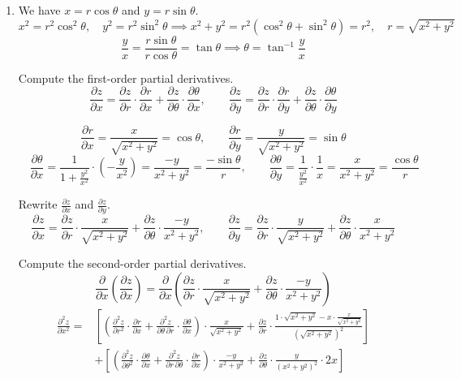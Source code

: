 \documentclass[a4paper, 12pt]{article}
\begin{document}
\begin{enumerate}[leftmargin=*,label=\textbf{\arabic*.}]
\item We have $x=r\cos\theta$ and $y=r\sin\theta$.
\[x^2=r^2\cos^2\theta,\quad y^2 =r^2\sin^2\theta\implies x^2+y^2=r^2\left(\cos^2\theta+\sin^2\theta\right)=r^2, \quad r=\sqrt{x^2+y^2}\]
\[\frac{y}{x}=\frac{r\sin\theta}{r\cos\theta}=\tan\theta \implies \theta=\tan^{-1}\frac{y}{x}\]

Compute the first-order partial derivatives.
\[\frac{\partial z}{\partial x}=\frac{\partial z}{\partial r}\cdot\frac{\partial r}{\partial x}+\frac{\partial z}{\partial \theta}\cdot\frac{\partial\theta}{\partial x},\quad\quad\frac{\partial z}{\partial y}=\frac{\partial z}{\partial r}\cdot\frac{\partial r}{\partial y} + \frac{\partial z}{\partial\theta}\cdot\frac{\partial\theta}{\partial y}\]

\vspace{-1em}
\[\frac{\partial r}{\partial x}=\frac{x}{\sqrt{x^2+y^2}}=\cos\theta,\quad\quad\frac{\partial r}{\partial y}=\frac{y}{\sqrt{x^2+y^2}}=\sin\theta\]
\[\quad\frac{\partial\theta}{\partial x}=\frac{1}{1+\frac{y^2}{x^2}}\cdot \left(-\frac{y}{x^2}\right)=\frac{-y}{x^2+y^2}=\frac{-\sin\theta}{r},\quad\quad\frac{\partial\theta}{\partial y}=\frac{1}{\frac{y^2}{x^2}}\cdot\frac{1}{x}=\frac{x}{x^2+y^2}=\frac{\cos\theta}{r}\]

Rewrite $\displaystyle\frac{\partial z}{\partial x}$ and $\displaystyle\frac{\partial z}{\partial y}$.
\[\frac{\partial z}{\partial x}=\frac{\partial z}{\partial r}\cdot\frac{x}{\sqrt{x^2+y^2}}+\frac{\partial z}{\partial\theta}\cdot\frac{-y}{x^2+y^2},\quad\quad\frac{\partial z}{\partial y}=\frac{\partial z}{\partial r}\cdot\frac{y}{\sqrt{x^2+y^2}}+\frac{\partial z}{\partial \theta}\cdot\frac{x}{x^2+y^2}\]

Compute the second-order partial derivatives.
\[\frac{\partial}{\partial x}\left(\frac{\partial z}{\partial x}\right)=\frac{\partial}{\partial x}\left(\frac{\partial z}{\partial r}\cdot\frac{x}{\sqrt{x^2+y^2}}+\frac{\partial z}{\partial\theta}\cdot\frac{-y}{x^2+y^2}\right)\]
\vspace{-1em}
\begin{align*}\frac{\partial^2z}{\partial x^2}=&\left[\left(\frac{\partial^2z}{\partial r^2}\cdot\frac{\partial r}{\partial x}+\frac{\partial^2 z}{\partial\theta\,\partial r}\cdot\frac{\partial\theta}{\partial x}\right)\cdot\frac{x}{\sqrt{x^2+y^2}}+\frac{\partial z}{\partial r}\cdot\frac{1\cdot\sqrt{x^2+y^2}-x\cdot\frac{x}{\sqrt{x^2+y^2}}}{\left(\sqrt{x^2+y^2}\right)^2}\right]\\[1em]&+\left[\left(\frac{\partial^2z}{\partial \theta^2}\cdot\frac{\partial \theta}{\partial x}+\frac{\partial^2 z}{\partial r\,\partial \theta}\cdot\frac{\partial r}{\partial x}\right)\cdot\frac{-y}{x^2+y^2}+\frac{\partial z}{\partial\theta}\cdot\frac{y}{(x^2+y^2)^2}\cdot2x\right]\end{align*}


\end{enumerate}
\end{document}
